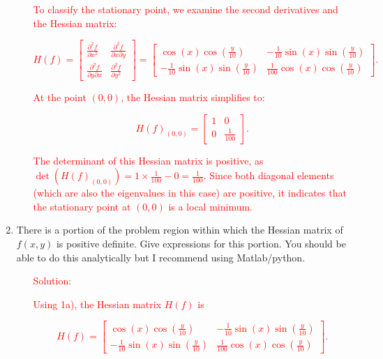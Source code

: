 \documentclass[11pt]{article}
\begin{document}
\begin{enumerate}
\begin{enumerate}
\textcolor{red}{
To classify the stationary point, we examine the second derivatives and the Hessian matrix:
}

\textcolor{red}{
\[
H(f) = \begin{bmatrix}
\frac{\partial^2 f}{\partial x^2} & \frac{\partial^2 f}{\partial x \partial y} \\
\frac{\partial^2 f}{\partial y \partial x} & \frac{\partial^2 f}{\partial y^2}
\end{bmatrix} = \begin{bmatrix}
\cos(x) \cos\left(\frac{y}{10}\right) & -\frac{1}{10} \sin(x) \sin\left(\frac{y}{10}\right) \\
-\frac{1}{10} \sin(x) \sin\left(\frac{y}{10}\right) & \frac{1}{100} \cos(x) \cos\left(\frac{y}{10}\right)
\end{bmatrix}.
\]
}


\textcolor{red}{
At the point $(0,0)$, the Hessian matrix simplifies to:
}

\textcolor{red}{
\[
H(f)_{(0,0)} = \begin{bmatrix}
1 & 0 \\
0 & \frac{1}{100}
\end{bmatrix}.
\]
}

\textcolor{red}{
The determinant of this Hessian matrix is positive, as $\det(H(f)_{(0,0)}) = 1 \times \frac{1}{100} - 0 = \frac{1}{100}$. Since both diagonal elements (which are also the eigenvalues in this case) are positive, it indicates that the stationary point at $(0,0)$ is a local minimum.
}
\end{enumerate}


  
\item There is a portion of the problem region
  within which the Hessian matrix of $f(x,y)$ is positive definite.
  Give expressions for this portion. You should be able to do this
  analytically but I recommend using Matlab/python.


\begin{enumerate}
    \item[\textcolor{red}{Solution:}] 
\textcolor{red}{

\textcolor{red}{
Using 1a), the Hessian matrix $H(f)$ is
}

\textcolor{red}{
\[
H(f) = \begin{bmatrix}
\cos(x) \cos\left(\frac{y}{10}\right) & -\frac{1}{10} \sin(x) \sin\left(\frac{y}{10}\right) \\
-\frac{1}{10} \sin(x) \sin\left(\frac{y}{10}\right) & \frac{1}{100} \cos(x) \cos\left(\frac{y}{10}\right)
\end{bmatrix}.
\]
}

}
\end{enumerate}
\end{enumerate}
\end{document}
